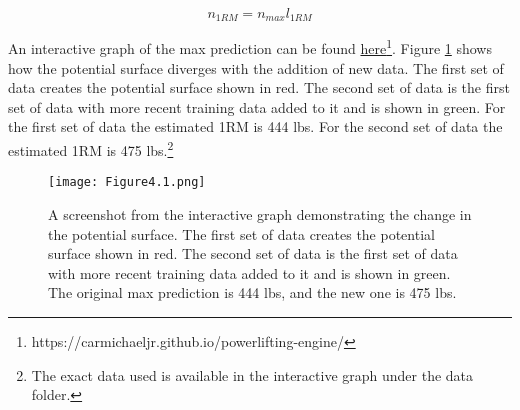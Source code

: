 \begin{equation}
    n_{1RM}=n_{max}l_{1RM}
\end{equation}

An interactive graph of the max prediction can be found \href{https://carmichaeljr.github.io/powerlifting-engine/}{here\footnote{https://carmichaeljr.github.io/powerlifting-engine/}}. Figure \ref{fig:Figure4.1} shows how the potential surface diverges with the addition of new data. The first set of data creates the potential surface shown in red. The second set of data is the first set of data with more recent training data added to it and is shown in green. For the first set of data the estimated 1RM is 444 lbs. For the second set of data the estimated 1RM is 475 lbs.\footnote{The exact data used is available in the interactive graph under the data folder.}

\begin{figure}[h]
    \centering
    \texttt{[image: Figure4.1.png]}
    \caption{A screenshot from the interactive graph demonstrating the change in the potential surface. The first set of data creates the potential surface shown in red. The second set of data is the first set of data with more recent training data added to it and is shown in green. The original max prediction is 444 lbs, and the new one is 475 lbs.}
    \label{fig:Figure4.1}
\end{figure}
